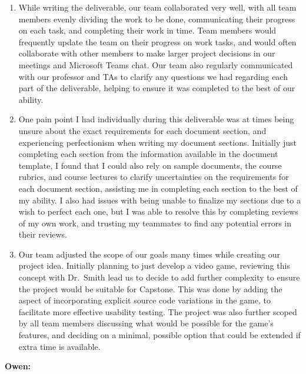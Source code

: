 \documentclass{article}
\begin{document}
\begin{enumerate}
	\item While writing the deliverable, our team collaborated very well, with 
	all team members evenly dividing the work to be done, communicating their 
	progress on each task, and completing their work in time. Team members 
	would frequently update the team on their progress on work tasks, and would 
	often collaborate with other members to make larger project decisions in 
	our meetings and Microsoft Teams chat. Our team also regularly communicated 
	with our professor and TAs to clarify any questions we had regarding each 
	part of the deliverable, helping to ensure it was completed to the best of 
	our ability.
	\item One pain point I had individually during this deliverable was at 
	times being unsure about the exact requirements for each document section, 
	and experiencing perfectionism when writing my document sections. Initially 
	just completing each section from the information available in the document 
	template, I found that I could also rely on sample documents, the course 
	rubrics, and course lectures to clarify uncertainties on the requirements 
	for each document section, assisting me in completing each section to the 
	best of my ability. I also had issues with being unable to finalize my 
	sections due to a wish to perfect each one, but I was able to resolve this 
	by completing reviews of my own work, and trusting my teammates to find any 
	potential errors in their reviews.
	\item Our team adjusted the scope of our goals many times while creating 
	our project idea. Initially planning to just develop a video game, 
	reviewing this concept with Dr.~Smith lead us to decide to add further 
	complexity to ensure the project would be suitable for Capstone. This was 
	done by adding the aspect of incorporating explicit source code variations 
	in the game, to facilitate more effective usability testing. The project 
	was also further scoped by all team members discussing what would be 
	possible for the game's features, and deciding on a minimal, possible 
	option that could be extended if extra time is available.
\end{enumerate} 

\noindent \textbf{Owen:}
\end{document}
